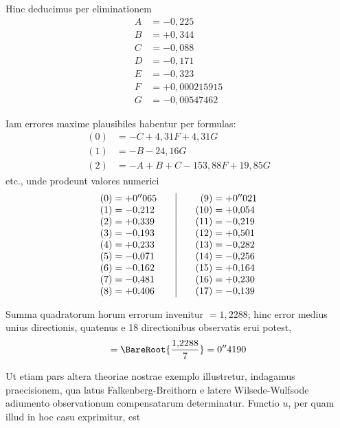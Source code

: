 Hinc deducimus per eliminationem
\[
\begin{aligned}
A&=-0{,}225\\
B&=+0{,}344\\
C&=-0{,}088\\
D&=-0{,}171\\
E&=-0{,}323\\
F&=+0{,}000215915\\
G&=-0{,}00547462
\end{aligned}
\]

Iam errores maxime plausibiles habentur per formulas:
\[
\begin{aligned}
(0)&=-C+4{,}31F+4{,}31G\\
(1)&=-B-24{,}16G\\
(2)&=-A+B+C-153{,}88F+19{,}85G
\end{aligned}
\]
etc., unde prodeunt valores numerici
\[
\begin{array}{r@{\;}l@{\qquad}|@{\qquad}r@{\;}l}
(0)=&+0''065&(9)=&+0''021\\
(1)=&-0{,}212&(10)=&+0{,}054\\
(2)=&+0{,}339&(11)=&-0{,}219\\
(3)=&-0{,}193&(12)=&+0{,}501\\
(4)=&+0{,}233&(13)=&-0{,}282\\
(5)=&-0{,}071&(14)=&-0{,}256\\
(6)=&-0{,}162&(15)=&+0{,}164\\
(7)=&-0{,}481&(16)=&+0{,}230\\
(8)=&+0{,}406&(17)=&-0{,}139
\end{array}
\]

Summa quadratorum horum errorum invenitur \(=1{,}2288\); hinc error medius unius directionis, quatenus e 18 directionibus observatis erui potest,
\[
=\BareRoot{\frac{1{,}2288}{7}}=0''4190
\]

Ut etiam pars altera theoriae nostrae exemplo illustretur, indagamus praecisionem, qua latus Falkenberg-Breithorn e latere Wilsede-Wulfsode adiumento observationum compensatarum determinatur. Functio \(u\), per quam illud in hoc casu exprimitur, est
